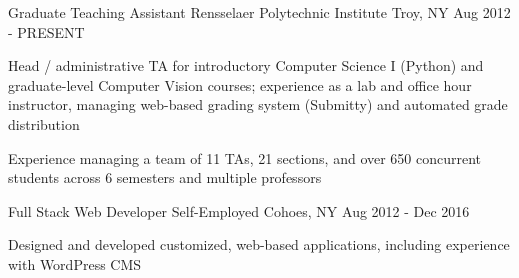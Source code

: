 \begin{cventries}
  \cventry
    {Graduate Teaching Assistant} %
    {Rensselaer Polytechnic Institute} %
    {Troy, NY} %
    {Aug 2012 - PRESENT} %
    {
      \begin{cvitems} %
        \item {Head / administrative TA for introductory Computer Science I (Python) and graduate-level Computer Vision courses; experience as a lab and office hour instructor, managing web-based grading system (Submitty) and automated grade distribution}
        \item {Experience managing a team of 11 TAs, 21 sections, and over 650 concurrent students across 6 semesters and multiple professors}
      \end{cvitems}
    }

  \cventry
    {Full Stack Web Developer} %
    {Self-Employed} %
    {Cohoes, NY} %
    {Aug 2012 - Dec 2016} %
    {
      \begin{cvitems} %
        \item {Designed and developed customized, web-based applications, including experience with WordPress CMS}
      \end{cvitems}
    }

\end{cventries}
